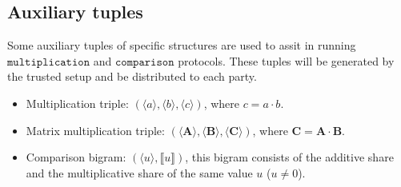 \documentclass[letterpaper]{article} %
\begin{document}
    \subsection{Auxiliary tuples}
    Some auxiliary tuples of specific structures are used to
    assit in running $\mathtt{multiplication}$ and $\mathtt{comparison}$ protocols.
    These tuples will be generated by the trusted setup and be distributed to each party.
    \begin{itemize}
        \item Multiplication triple: $(\langle a\rangle,\langle b\rangle,\langle c\rangle)$, where $c=a\cdot b$.
        \item Matrix multiplication triple: $(\langle \mathbf{A}\rangle,\langle \mathbf{B}\rangle,\langle \mathbf{C}\rangle)$, where $\mathbf{C}=\mathbf{A}\cdot \mathbf{B}$.
        \item Comparison bigram: $(\langle u\rangle,\llbracket u \rrbracket)$,
        this bigram consists of the additive share and the multiplicative share of the same value $u$ ($u\neq 0 $).
    \end{itemize}
\end{document}
